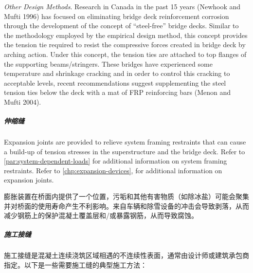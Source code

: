 \emph{Other Design Methods}. Research in Canada in the past 15 years (Newhook and Mufti 1996) has focused on eliminating bridge deck reinforcement corrosion through the development of the concept of “steel-free” bridge decks.  Similar to the methodology employed by the empirical design method, this concept provides the tension tie required to resist the compressive forces created in bridge deck by arching action. Under this concept, the tension ties are attached to top flanges of the supporting beams/stringers. These bridges have experienced some temperature and shrinkage cracking and in order to control this cracking to acceptable levels, recent recommendations suggest supplementing the steel tension ties below the deck with a mat of FRP reinforcing bars (Menon and Mufti 2004).

\subparagraph{伸缩缝}
Expansion joints are provided to relieve system framing restraints that can cause a build-up of tension stresses in the superstructure and the bridge deck. Refer to \cref{par:system-dependent-loads} for additional information on system framing restraints. Refer to \cref{chp:expansion-devices}, for additional information on expansion joints.

膨胀装置在桥面内提供了一个位置，污垢和其他有害物质（如除冰盐）可能会聚集并对桥面的使用寿命产生不利影响。来自车辆和除雪设备的冲击会导致剥落，从而减少钢筋上的保护混凝土覆盖层和/或暴露钢筋，从而导致腐蚀。

\subparagraph{施工接缝}
施工接缝是混凝土连续浇筑区域相遇的不连续性表面，通常由设计师或建筑承包商指定。以下是一些需要施工缝的典型施工方法：

